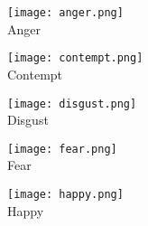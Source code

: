 \documentclass[a4paper,13pt]{report}
\begin{document}
\begin{figure}[H]
    \centering
    \begin{minipage}{0.19\textwidth}
        \centering
        \texttt{[image: anger.png]} \\ %
        \vspace{3pt}
        \small Anger
    \end{minipage}
    \hfill
    \begin{minipage}{0.19\textwidth}
        \centering
        \texttt{[image: contempt.png]} \\ %
        \vspace{3pt}
        \small Contempt
    \end{minipage}
    \hfill
    \begin{minipage}{0.19\textwidth}
        \centering
        \texttt{[image: disgust.png]} \\ %
        \vspace{3pt}
        \small Disgust
    \end{minipage}
    \hfill
    \begin{minipage}{0.19\textwidth}
        \centering
        \texttt{[image: fear.png]} \\ %
        \vspace{3pt}
        \small Fear
    \end{minipage}
    \hfill
    \begin{minipage}{0.19\textwidth}
        \centering
        \texttt{[image: happy.png]} \\ %
        \vspace{3pt}
        \small Happy
    \end{minipage}

    \vspace{10pt} %


\end{figure}
\end{document}
